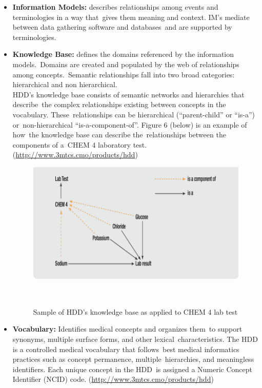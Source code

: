 \documentclass[DIV=calc, paper=a4, fontsize=12pt, onecolumn]{scrartcl}	 %
\begin{document}
  \begin{itemize}
    \itemsep0ex
    \item  \textbf{Information Models:} describes relationships among events and terminologies in a way that\
    gives them meaning and context. IM's mediate between data gathering software and databases\
    and are supported by terminologies.\\

    \item  \textbf{Knowledge Base:} defines the domains referenced by the information models.\
    Domains are created and populated by the web of relationships among concepts.\
    Semantic relationships fall into two broad categories: hierarchical and non hierarchical.\\

    HDD's knowledge base consists of semantic networks and hierarchies that describe\
    the complex relationships existing between concepts in the vocabulary. These\
    relationships can be hierarchical (``parent-child'' or ``is-a'') or\ 
    non-hierarchical ``is-a-component-of''. Figure 6 (below) is an example of how\
    the knowledge base can describe the\ relationships between the components of a\
    CHEM 4 laboratory test.\\
    (\url{http://www.3mtcs.cmo/products/hdd})

    \begin{figure}[ht!]
      \label{fig:lab}
      \centering
      \includegraphics[scale=0.4]{labtest.png}
      \caption{Sample of HDD's knowledge base as applied to CHEM 4 lab test}\
    \end{figure}  


    \item \textbf{Vocabulary:} Identifies medical concepts and organizes them\
    to support synonyms, multiple surface forms, and other lexical\
    characteristics. The HDD is a controlled medical vocabulary that follows\
    best medical informatics practices such as concept permanence, multiple\
    hierarchies, and meaningless identifiers. Each unique concept in the HDD\
    is assigned a Numeric Concept Identifier (NCID) code. (\url{http://www.3mtcs.cmo/products/hdd}) 
  \end{itemize}
\end{document}
